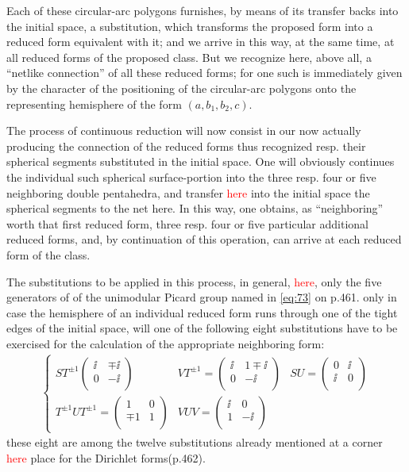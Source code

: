 Each of these circular-arc polygons furnishes, by means of its transfer backs into the initial space, a substitution, which transforms the proposed form into a reduced form equivalent with it; and we arrive in this way, at the same time, at all reduced forms of the proposed class. But we recognize here, above all, a “netlike connection” of all these reduced forms; for one such is immediately given by the character of the positioning of the circular-arc polygons onto the representing hemisphere of the form $(a,b_1,b_2,c)$.

The process of continuous reduction will now consist in our now actually producing the connection of the reduced forms thus recognized resp. their spherical segments substituted in the initial space. One will obviously continues the individual such spherical surface-portion into the three resp. four or five neighboring double pentahedra, and transfer \textcolor{red}{here} into the initial space the spherical segments to the net here. In this way, one obtains, as “neighboring” worth that first reduced form, three resp. four or five particular additional reduced forms, and, by continuation of this operation, can arrive at each reduced form of the class.

The substitutions to be applied in this process, in general, \textcolor{red}{here}, only the five generators of  of the unimodular Picard group named in \ref{eq:73} on p.461. only in case the hemisphere of an individual reduced form runs through one of the tight edges of the initial space, will one of the following eight substitutions have to be exercised for the calculation of the appropriate neighboring form:
\begin{align}
    \left\{\begin{array}{ccc}
    ST^{\pm 1}\left(\begin{array}{cc}
    \ii & \mp \ii\\
    0 & -\ii\\
    \end{array}\right) & VT^{\pm 1}=\left(\begin{array}{cc}
    \ii & 1\mp \ii\\
    0 & -\ii\\
    \end{array}\right) & SU=\left(\begin{array}{cc}
    0 & \ii\\
    \ii & 0\\
    \end{array}\right)\\
    T^{\pm 1}UT^{\pm 1}=\left(\begin{array}{cc}
    1 & 0\\
    \mp 1 & 1\\
    \end{array}\right) & VUV=\left(\begin{array}{cc}
    \ii & 0\\
    1 & -\ii\\
    \end{array}\right) & 
    \end{array}\right.
\end{align}
these eight are among the twelve substitutions already mentioned at a corner \textcolor{red}{here} place for the Dirichlet forms(p.462).

